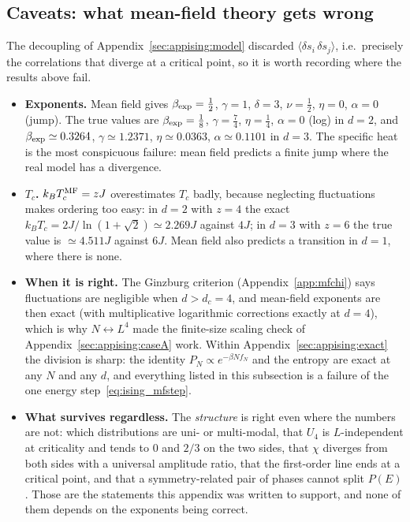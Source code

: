\documentclass[10pt,a4paper]{article}
\theoremstyle{remark}
\begin{document}
\subsection{Caveats: what mean-field theory gets wrong}
\label{sec:appising:caveats}

The decoupling of Appendix~\ref{sec:appising:model} discarded $\langle\delta s_i\,
\delta s_j\rangle$, i.e.\ precisely the correlations that diverge at a critical
point, so it is worth recording where the results above fail.

\begin{itemize}
\item \textbf{Exponents.} Mean field gives $\beta_{\rm exp}=\tfrac12$,
$\gamma=1$, $\delta=3$, $\nu=\tfrac12$, $\eta=0$, $\alpha=0$ (jump). The true
values are $\beta_{\rm exp}=\tfrac18$, $\gamma=\tfrac74$, $\eta=\tfrac14$,
$\alpha=0$ (log) in $d=2$, and $\beta_{\rm exp}\simeq0.3264$,
$\gamma\simeq1.2371$, $\eta\simeq0.0363$, $\alpha\simeq0.1101$ in $d=3$. The
specific heat is the most conspicuous failure: mean field predicts a finite jump
where the real model has a divergence.
\item \textbf{$T_c$.} $k_BT_c^{\rm MF}=zJ$ overestimates $T_c$ badly, because
neglecting fluctuations makes ordering too easy: in $d=2$ with $z=4$ the exact
$k_BT_c=2J/\ln(1+\sqrt2)\simeq2.269J$ against $4J$; in $d=3$ with $z=6$ the true
value is $\simeq4.511J$ against $6J$. Mean field also predicts a transition in
$d=1$, where there is none.
\item \textbf{When it is right.} The Ginzburg criterion (Appendix~\ref{app:mfchi}) says fluctuations are
negligible when $d>d_c=4$, and mean-field exponents are then exact (with
multiplicative logarithmic corrections exactly at $d=4$), which is why
$N\leftrightarrow L^{4}$ made the finite-size scaling check of
Appendix~\ref{sec:appising:caseA} work. Within
Appendix~\ref{sec:appising:exact} the division is sharp: the identity
$P_N\propto e^{-\beta Nf_N}$ and the entropy are exact at any $N$ and any $d$,
and everything listed in this subsection is a failure of the one energy
step~\eqref{eq:ising_mfstep}.
\item \textbf{What survives regardless.} The \emph{structure} is right even where
the numbers are not: which distributions are uni- or multi-modal, that $U_4$ is
$L$-independent at criticality and tends to $0$ and $2/3$ on the two sides, that
$\chi$ diverges from both sides with a universal amplitude ratio, that the
first-order line ends at a critical point, and that a symmetry-related pair of
phases cannot split $P(E)$. Those are the statements this appendix was written to
support, and none of them depends on the exponents being correct.
\end{itemize}
\end{document}
